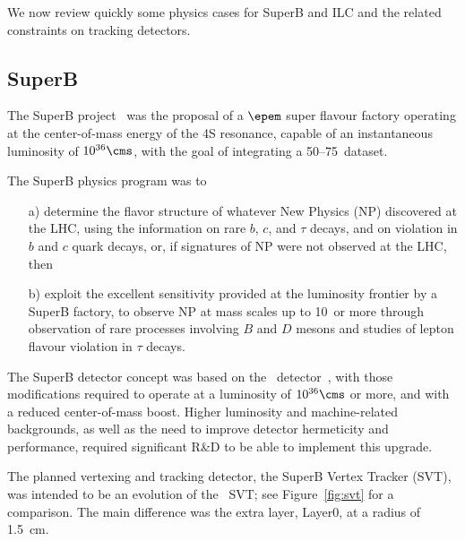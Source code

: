 We now review quickly some physics cases for SuperB and ILC and the related constraints on 
tracking detectors.
\subsection{SuperB}

The SuperB project~\cite{Baszczyk:2013xua} was the proposal of a $\epem$ super flavour  factory operating at the 
 center-of-mass energy of the \Y4S resonance, capable of an instantaneous 
 luminosity of  $10^{36}\cms$, with the goal of integrating a 50--75~\invab dataset.

The SuperB physics program was to 
\begin{itemize}
\item[a)]determine the flavor structure of whatever New Physics (NP) discovered at the LHC, 
using the information on rare $b$, $c$, and $\tau$ decays, and on \CP
violation in $b$ and $c$ quark decays, or, if  signatures of NP were not observed at the LHC,
then
\item[b)]  exploit the excellent sensitivity provided at the luminosity frontier by
a SuperB factory, to
observe NP at mass scales up to 10~\tev or more through
observation of rare processes involving $B$ and $D$ mesons and studies
of lepton flavour violation in $\tau$ decays.
\end{itemize}

The SuperB detector concept was based on the \babar\ detector~\cite{AUBERT20021}, with
those modifications required to operate at a luminosity of $10^{36}\cms$
or more, and with a reduced center-of-mass boost.
Higher luminosity and machine-related backgrounds, as well
as the need to  improve detector hermeticity
and performance, required significant R\&D
to be able to implement this upgrade.


The planned vertexing and tracking detector, the SuperB Vertex Tracker (SVT), was intended to be an evolution of the \babar\ 
SVT; see Figure~\ref{fig:svt} for a comparison. The main difference was the extra layer, Layer0, 
at a radius of 1.5~cm.

